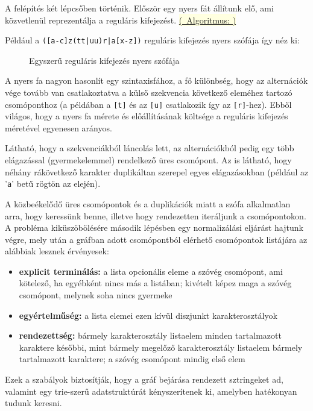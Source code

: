 \documentclass[
    parspace,
    noindent,
    nohyp,
]{elteiktdk}[2023/04/10]
\newcommand{\algorithmref}[1]{\hyperref[algorithm:#1]{\colorbox{lightyellow}{%
(\textrightarrow~Algoritmus: \nameref*{algorithm:#1})}}}
\newcommand{\regextt}[1]{\texttt{\colorbox{verylightgray}{#1}}}
\begin{document}
A felépítés két lépcsőben történik.
Először egy nyers fát állítunk elő, ami közvetlenül reprezentálja a reguláris kifejezést.
\algorithmref{regex_wordtree_create_raw}

Például a \regextt{([a-c]z(tt|uu)r|a[x-z])} reguláris kifejezés nyers szófája így néz ki:

\begin{figure}[H]
\centering

\caption{Egyszerű reguláris kifejezés nyers szófája}
\end{figure}

A nyers fa nagyon hasonlít egy szintaxisfához,
a fő különbség, hogy az alternációk vége tovább van csatlakoztatva a külső szekvencia
következő eleméhez tartozó csomóponthoz
(a példában a \regextt{[t]} és az \regextt{[u]} csatlakozik így az \regextt{[r]}-hez).
Ebből világos, hogy a nyers fa mérete és előállításának költsége
a reguláris kifejezés méretével egyenesen arányos.

Látható, hogy a szekvenciákból láncolás lett,
az alternációkból pedig egy több elágazással (gyermekelemmel) rendelkező üres csomópont.
Az is látható, hogy néhány rákövetkező karakter duplikáltan szerepel egyes elágazásokban
(például az '\texttt{a}' betű rögtön az elején).

A közbeékelődő üres csomópontok és a duplikációk miatt
a szófa alkalmatlan arra, hogy keressünk benne,
illetve hogy rendezetten iteráljunk a csomópontokon.
A probléma kiküszöbölésére második lépésben egy normalizálási eljárást hajtunk végre,
mely után a gráfban adott csomópontból elérhető csomópontok listájára az alábbiak lesznek érvényesek:

\begin{itemize}
    \item \textbf{explicit terminálás:} a lista opcionális eleme a szóvég csomópont, ami kötelező, ha egyébként nincs más a listában; kivételt képez maga a szóvég csomópont, melynek soha nincs gyermeke
    \item \textbf{egyértelműség:} a lista elemei ezen kívül diszjunkt karakterosztályok
    \item \textbf{rendezettség:} bármely karakterosztály listaelem minden tartalmazott karaktere későbbi, mint bármely megelőző karakterosztály listaelem bármely tartalmazott karaktere; a szóvég csomópont mindig első elem
\end{itemize}

Ezek a szabályok biztosítják, hogy a gráf bejárása rendezett sztringeket ad,
valamint egy trie-szerű adatstruktúrát kényszerítenek ki, amelyben hatékonyan tudunk keresni.
\end{document}
